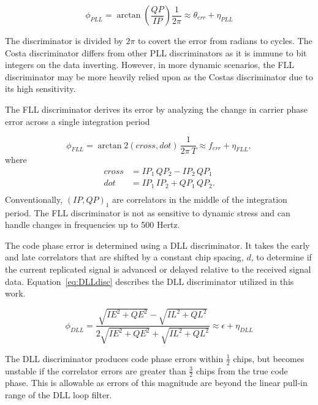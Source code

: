 \begin{equation}\label{eq:PLLdisc}
    \phi_{PLL} = \arctan\left(\frac{QP}{IP}\right) \frac{1}{2\pi} \approx \theta_{err} + \eta_{PLL}
\end{equation}

The discriminator is divided by \(2 \pi \) to covert the error from radians to cycles. The Costa discriminator differs from other PLL discriminators as it is immune to bit integers on the data inverting. However, in more dynamic scenarios, the FLL discriminator may be more heavily relied upon as the Costas discriminator due to its high sensitivity.

The FLL discriminator derives its error by analyzing the change in carrier phase error across a single integration period

\begin{equation}\label{eq:FLLdisc}
    \phi_{FLL} = \arctan2\left(cross,dot\right) \, \frac{1}{2\pi \,T} \approx f_{err} + \eta_{FLL},
\end{equation}
where
\begin{equation}\label{eq:crossdot}
    \begin{split}
        cross & = IP_1\,QP_2 - IP_2\,QP_1\\
        dot & = IP_1\,IP_2 + QP_1\,QP_2. \\
    \end{split}
\end{equation}
Conventionally, \({\left(IP,QP\right)}_1\) are correlators in the middle of the integration period. The FLL discriminator is not as sensitive to dynamic stress and can handle changes in frequencies up to 500 Hertz.

The code phase error is determined using a DLL discriminator. It takes the early and late correlators that are shifted by a constant chip spacing, \(d\), to determine if the current replicated signal is advanced or delayed relative to the received signal data. Equation~\ref{eq:DLLdisc} describes the DLL discriminator utilized in this work.

\begin{equation}\label{eq:DLLdisc}
    \phi_{DLL} = \frac{\sqrt{IE^2 + QE^2} - \sqrt{IL^2 + QL^2}}{2 \sqrt{IE^2 + QE^2} + \sqrt{IL^2 + QL^2}} \approx \epsilon + \eta_{DLL}
\end{equation}

The DLL discriminator produces code phase errors within \(\frac{1}{2}\) chips, but becomes unstable if the correlator errors are greater than \(\frac{3}{2}\) chips from the true code phase. This is allowable as errors of this magnitude are beyond the linear pull-in range of the DLL loop filter.

